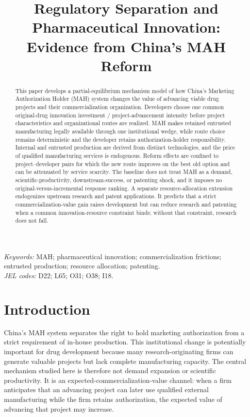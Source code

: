 \documentclass[12pt]{article}
\title{Regulatory Separation and Pharmaceutical Innovation: Evidence from China's MAH Reform}
\author{}
\date{}
\newcommand{\1}{\mathbf{1}}
\begin{document}
\maketitle
\thispagestyle{plain}

\begin{abstract}
\noindent
This paper develops a partial-equilibrium mechanism model of how China's
Marketing Authorization Holder (MAH) system changes the value of advancing
viable drug projects and their commercialization organization. Developers
choose one common original-drug innovation investment / project-advancement
intensity before project characteristics and organizational routes are
realized. MAH makes retained entrusted manufacturing legally available
through one institutional wedge, while route choice remains deterministic and
the developer retains authorization-holder responsibility. Internal and
entrusted production are derived from distinct technologies, and the price of
qualified manufacturing services is endogenous. Reform effects are confined
to project--developer pairs for which the new route improves on the best old
option and can be attenuated by service scarcity. The baseline does not treat
MAH as a demand, scientific-productivity, downstream-success, or patenting
shock, and it imposes no original-versus-incremental response ranking. A
separate resource-allocation extension endogenizes upstream research and
patent applications. It predicts that a strict commercialization-value gain
raises development but can reduce research and patenting when a common
innovation-resource constraint binds; without that constraint, research does
not fall.
\end{abstract}

\noindent\textit{Keywords:} MAH; pharmaceutical innovation; commercialization frictions; entrusted production; resource allocation; patenting.\\
\noindent\textit{JEL codes:} D22; L65; O31; O38; I18.

\section{Introduction}

China's MAH system separates the right to hold marketing authorization from a
strict requirement of in-house production. This institutional change is
potentially important for drug development because many research-originating
firms can generate valuable projects but lack complete manufacturing
capacity. The central mechanism studied here is therefore not demand expansion
or scientific productivity. It is an expected-commercialization-value
channel: when a firm anticipates that an advancing project can later use
qualified external manufacturing while the firm retains authorization, the
expected value of advancing that project may increase.
\end{document}
